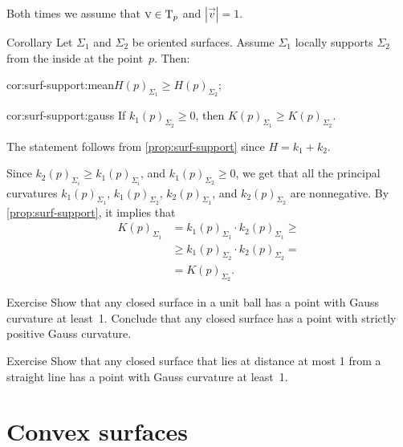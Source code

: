 Both times we assume  that  $\text{\sc{v}}\in\mathrm{T}_p$ and $|\vec v|=1$.\qeds

\begin{thm}{Corollary}\label{cor:surf-support}
Let $\Sigma_1$ and $\Sigma_2$ be oriented surfaces.
Assume $\Sigma_1$ locally supports $\Sigma_2$ from the inside at the point~$p$.
Then:

\begin{subthm}{cor:surf-support:mean}$H(p)_{\Sigma_1}\ge H(p)_{\Sigma_2}$;
\end{subthm}

\begin{subthm}{cor:surf-support:gauss} If $k_1(p)_{\Sigma_2}\ge 0$, then $K(p)_{\Sigma_1}\ge K(p)_{\Sigma_2}$.
\end{subthm}
 
\end{thm}

The statement follows from  \ref{prop:surf-support} since $H=k_1+k_2$. 


 Since $k_2(p)_{\Sigma_i}\ge k_1(p)_{\Sigma_i}$, and $k_1(p)_{\Sigma_2}\ge 0$, we get that all the principal curvatures 
$k_1(p)_{\Sigma_1}$, 
$k_1(p)_{\Sigma_2}$, 
$k_2(p)_{\Sigma_1}$, and 
$k_2(p)_{\Sigma_2}$ are nonnegative.
By \ref{prop:surf-support}, it implies that
\begin{align*}
K(p)_{\Sigma_1}&=k_1(p)_{\Sigma_1}\cdot k_2(p)_{\Sigma_1}\ge 
\\
&\ge k_1(p)_{\Sigma_2}\cdot k_2(p)_{\Sigma_2}=
\\
&=K(p)_{\Sigma_2}.
\end{align*}
\qedsf

\begin{thm}{Exercise}\label{ex:positive-gauss-0}
Show that any closed surface in a unit ball has a point with Gauss curvature at least~1.
Conclude that any closed surface has a point with strictly positive Gauss curvature.
\end{thm}

\begin{thm}{Exercise}\label{ex:positive-gauss}
Show that any closed surface that lies at distance at most 1 from a straight line has a point with Gauss curvature at least~1.
\end{thm}

\section{Convex surfaces}

